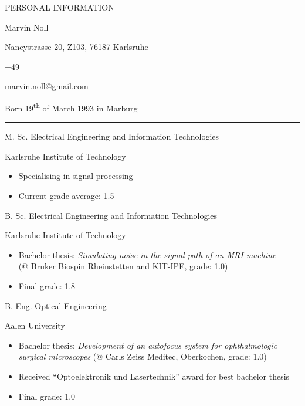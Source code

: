 \documentclass[a4paper,10pt]{article}
\newlength{\cvcolumngapwidth}
\newlength{\cvleftcolumnwidth}
\newlength{\cvrightcolumnwidth}
\newcommand{\cvnamestyle}[1]{{\Large\textcolor{cvnamecolor}{#1}}}
\newcommand{\cvsectionstyle}[1]{{\normalsize\textcolor{cvsectioncolor}{#1}}}
\newcommand{\cvtitlestyle}[1]{{\large\textcolor{cvtitlecolor}{#1}}}
\newcommand{\cvdurationstyle}[1]{{\small\textcolor{cvdurationcolor}{#1}}}
\newlength{\cvafteritemskipamount}
\newlength{\cvaftersectionskipamount}
\newlength{\cvafternameskipamount}
\newlength{\cvafterpersonalinfolineskipamount}
\newlength{\cvaftertitleskipamount}
\newlength{\cvparskip}
\newcommand{\cvpersonalinfo}[2]{
    \begin{minipage}[t]{\cvleftcolumnwidth}
        \vspace{0mm} %
        \raggedleft #1
    \end{minipage}%
    \hspace{\cvcolumngapwidth}%
    \begin{minipage}[t]{\cvrightcolumnwidth}
        \vspace{0mm} %
        #2
    \end{minipage}

    \vspace{\cvafteritemskipamount}
}
\newcommand{\cvname}[1]{
    \cvnamestyle{#1}

    \vspace{\cvafternameskipamount}
}
\newcommand{\cvpersonalinfolinewithicon}[3]{
    \raisebox{.5\fontcharht\font`E-.5\height}{\texttt{[image: \#2]}}
    #3

    \vspace{\cvafterpersonalinfolineskipamount}
}
\newcommand{\cvsection}[1]{
    \begin{minipage}[t][][b]{\cvleftcolumnwidth}
        \raggedleft\cvsectionstyle{#1}
    \end{minipage}%
    \hspace{\cvcolumngapwidth}%
    \begin{minipage}[t]{\cvrightcolumnwidth}
        \textcolor{cvrulecolor}{\rule{\cvrightcolumnwidth}{0.3mm}}
    \end{minipage}

    \vspace{\cvaftersectionskipamount}
}
\newcommand{\cvitem}[2]{
    \begin{minipage}[t]{\cvleftcolumnwidth}
    \strut\vspace*{-\baselineskip}\newline %
    \raggedleft #1
    \end{minipage}%
    \hspace{\cvcolumngapwidth}%
    \begin{minipage}[t]{\cvrightcolumnwidth}
        \setlength{\parskip}{\cvparskip}
        \strut\vspace*{-\baselineskip}\newline #2 %
    \end{minipage}

    \vspace{\cvafteritemskipamount}
}
\newcommand{\cvtitle}[1]{
    \cvtitlestyle{#1}

    \vspace{\cvaftertitleskipamount}
    \vspace{-\cvparskip}
}
\begin{document}
\cvpersonalinfo{
    \cvsectionstyle{PERSONAL INFORMATION}
}{
    \cvname{Marvin Noll}

    \cvpersonalinfolinewithicon{height=4mm}{resources/europasscv-icons/address_europass_icon.pdf}{
        Nancystrasse 20, Z103, 76187 Karlsruhe
    }

    \cvpersonalinfolinewithicon{height=4mm}{resources/europasscv-icons/mobile_europass_icon.pdf}{
        +49\;151\;270\;672\;86
    }

    \cvpersonalinfolinewithicon{height=4mm}{resources/europasscv-icons/mail_europass_icon.pdf}{
        marvin.noll@gmail.com
    }


    Born 19\textsuperscript{th} of March 1993 in Marburg
}

\cvsection{EDUCATION}
\cvitem{\cvdurationstyle{2018 -- now}}{\cvtitle{M. Sc. Electrical Engineering and Information Technologies}
    Karlsruhe Institute of Technology
    \begin{itemize}[leftmargin=*]
        \item Specialising in signal processing
        \item Current grade average: 1.5
    \end{itemize}
}

\cvitem{\cvdurationstyle{2016 -- 2018}}{\cvtitle{B. Sc. Electrical Engineering and Information Technologies}
    Karlsruhe Institute of Technology
    \begin{itemize}[leftmargin=*]
    	\item Bachelor thesis: \textit{Simulating noise in the signal path of an MRI machine}\\(@ Bruker Biospin Rheinstetten and KIT-IPE, grade: 1.0)
        \item Final grade: 1.8
    \end{itemize}
}

\cvitem{\cvdurationstyle{2012 -- 2015}}{\cvtitle{B. Eng. Optical Engineering}
    Aalen University
    \begin{itemize}[leftmargin=*]
    	\item Bachelor thesis: \textit{Development of an autofocus system for ophthalmologic surgical microscopes} (@ Carls Zeiss Meditec, Oberkochen, grade: 1.0)
    	\item Received ``Optoelektronik und Lasertechnik'' award for best bachelor thesis
        \item Final grade: 1.0
    \end{itemize}
}
\end{document}
